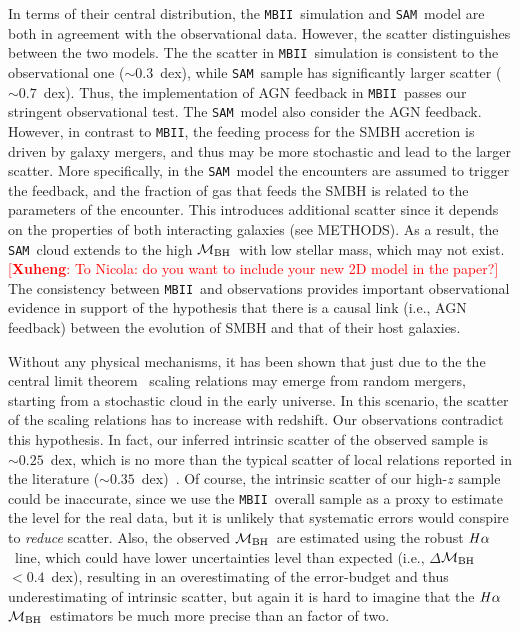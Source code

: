 \documentclass{natureprintstyle}
\newcommand{\mbh}{$\mathcal M_{\rm BH}$}
\newcommand{\halpha}{${\it H}\alpha$}
\newcommand{\sam}{\texttt{SAM}}
\newcommand{\mbii}{\texttt{MBII}}
\newcommand{\ding}[1]{\textcolor{red}{[{\bf Xuheng}: #1]}}
\begin{document}
In terms of their central distribution, the \mbii\ simulation and \sam\ model are both in agreement with the observational data. However, the scatter distinguishes between the two models. The  the scatter in \mbii\ simulation is consistent to the observational one ($\sim0.3$~dex), while \sam\ sample has significantly larger scatter ($\sim0.7$~dex). Thus, the implementation of AGN feedback in \mbii\ passes our stringent observational test. The \sam\ model also consider the AGN feedback. However, in contrast to \mbii, the feeding process for the SMBH accretion is driven by galaxy mergers, and thus may be more stochastic and lead to the larger scatter. More specifically, in the \sam\ model the encounters are assumed to trigger the feedback, and the fraction of gas that feeds the SMBH is related to the parameters of the  encounter. This introduces additional scatter since it depends on the properties of both interacting galaxies (see METHODS). As a result, the \sam\ cloud extends to the high \mbh\ with low stellar mass, which may not exist. \ding{To Nicola: do you want to include your new 2D model in the paper?} The consistency between \mbii\ and observations provides important observational evidence in support of the hypothesis that there is a causal link (i.e., AGN feedback) between the evolution of SMBH and that of their host galaxies.

Without any physical mechanisms, it has been shown that just due to the the central limit theorem~\cite{Peng2007, Jahnke2011, Hirschmann2010} scaling relations may emerge from random mergers, starting from a stochastic cloud in the early universe. In this scenario, the scatter of the scaling relations has to increase with redshift. Our observations contradict this hypothesis. In fact, our inferred intrinsic scatter of the observed sample is $\sim0.25$~dex, which is no more than the typical scatter of local relations reported in the literature ($\sim0.35$~dex)~\cite{Kormendy13, Gul++09}. Of course, the intrinsic scatter of our high-$z$ sample could be inaccurate, since we use the \mbii\ overall sample as a proxy to estimate the level for the real data, but it is unlikely that systematic errors would conspire to {\it reduce} scatter.
Also, the observed \mbh\ are estimated using the robust \halpha\ line, which could have lower uncertainties level than expected (i.e., $\Delta$\mbh$<0.4$~dex), resulting in an overestimating of the error-budget and thus underestimating of intrinsic scatter, but again it is hard to imagine that the \halpha\ \mbh\ estimators be much more precise than an factor of two. 
\end{document}

